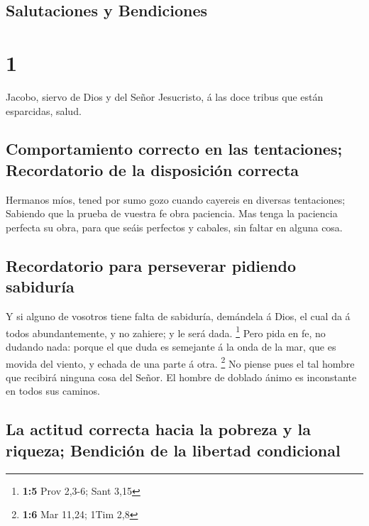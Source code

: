 \hypertarget{salutaciones-y-bendiciones}{%
\subsection{Salutaciones y
Bendiciones}\label{salutaciones-y-bendiciones}}

\hypertarget{section}{%
\section{1}\label{section}}

 Jacobo, siervo de Dios y del Señor Jesucristo, á las doce
tribus que están esparcidas, salud.

\hypertarget{comportamiento-correcto-en-las-tentaciones-recordatorio-de-la-disposiciuxf3n-correcta}{%
\subsection{Comportamiento correcto en las tentaciones; Recordatorio de
la disposición
correcta}\label{comportamiento-correcto-en-las-tentaciones-recordatorio-de-la-disposiciuxf3n-correcta}}

 Hermanos míos, tened por sumo gozo cuando cayereis en
diversas tentaciones;  Sabiendo que la prueba de vuestra fe
obra paciencia.  Mas tenga la paciencia perfecta su obra,
para que seáis perfectos y cabales, sin faltar en alguna cosa.

\hypertarget{recordatorio-para-perseverar-pidiendo-sabiduruxeda}{%
\subsection{Recordatorio para perseverar pidiendo
sabiduría}\label{recordatorio-para-perseverar-pidiendo-sabiduruxeda}}

 Y si alguno de vosotros tiene falta de sabiduría, demándela
á Dios, el cual da á todos abundantemente, y no zahiere; y le será dada.
\footnote{\textbf{1:5} Prov 2,3-6; Sant 3,15}  Pero pida en
fe, no dudando nada: porque el que duda es semejante á la onda de la
mar, que es movida del viento, y echada de una parte á otra. \footnote{\textbf{1:6}
  Mar 11,24; 1Tim 2,8}  No piense pues el tal hombre que
recibirá ninguna cosa del Señor.  El hombre de doblado ánimo
es inconstante en todos sus caminos.

\hypertarget{la-actitud-correcta-hacia-la-pobreza-y-la-riqueza-bendiciuxf3n-de-la-libertad-condicional}{%
\subsection{La actitud correcta hacia la pobreza y la riqueza; Bendición
de la libertad
condicional}\label{la-actitud-correcta-hacia-la-pobreza-y-la-riqueza-bendiciuxf3n-de-la-libertad-condicional}}


